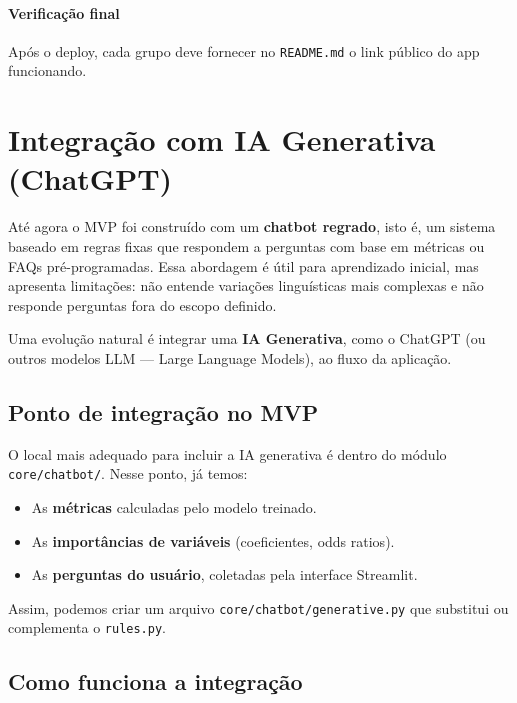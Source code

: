 \documentclass[12pt,a4paper]{article}
\begin{document}
\paragraph{Verificação final}  
Após o deploy, cada grupo deve fornecer no \texttt{README.md} o link público do app funcionando.






\clearpage
\section{Integração com IA Generativa (ChatGPT)}

Até agora o MVP foi construído com um \textbf{chatbot regrado}, isto é, um sistema baseado em regras fixas que respondem a perguntas com base em métricas ou FAQs pré-programadas. Essa abordagem é útil para aprendizado inicial, mas apresenta limitações: não entende variações linguísticas mais complexas e não responde perguntas fora do escopo definido.

Uma evolução natural é integrar uma \textbf{IA Generativa}, como o ChatGPT (ou outros modelos LLM --- Large Language Models), ao fluxo da aplicação.

\subsection{Ponto de integração no MVP}

O local mais adequado para incluir a IA generativa é dentro do módulo \texttt{core/chatbot/}. Nesse ponto, já temos:

\begin{itemize}
  \item As \textbf{métricas} calculadas pelo modelo treinado.
  \item As \textbf{importâncias de variáveis} (coeficientes, odds ratios).
  \item As \textbf{perguntas do usuário}, coletadas pela interface Streamlit.
\end{itemize}

Assim, podemos criar um arquivo \texttt{core/chatbot/generative.py} que substitui ou complementa o \texttt{rules.py}.

\subsection{Como funciona a integração}
\end{document}
